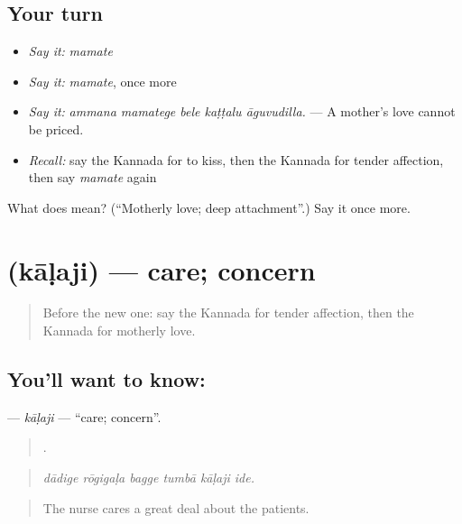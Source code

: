 \subsection*{Your turn}
\begin{itemize}
\raggedright
  \item \emph{Say it:} \emph{mamate}
  \item \emph{Say it:} \emph{mamate}, once more
  \item \emph{Say it:} \emph{ammana mamatege bele kaṭṭalu āguvudilla.} — A mother's love cannot be priced.
  \item \emph{Recall:} say the Kannada for to kiss, then the Kannada for tender affection, then say \emph{mamate} again
\end{itemize}

\begin{tcolorbox}[breakable,colback=teal!4,colframe=teal!35!black,title={Before you move on}]
What does  mean? (\textquotedblleft{}Motherly love; deep attachment\textquotedblright{}.) Say it once more.
\end{tcolorbox}
\section[\texorpdfstring{\kn{ಕಾಳಜಿ} (kāḷaji)}{ಕಾಳಜಿ (kāḷaji)}]{ (kāḷaji) — care; concern}

\label{lesson:KA-C495-kalaji}



\begin{quote}
Before the new one: say the Kannada for tender affection, then the Kannada for motherly love.
\end{quote}

\subsection*{You'll want to know: }
\textbf{} — \emph{kāḷaji} — \textquotedblleft{}care; concern\textquotedblright{}.

\begin{quote}
     .
\end{quote}

\begin{quote}
\emph{dādige rōgigaḷa bagge tumbā kāḷaji ide.}
\end{quote}

\begin{quote}
The nurse cares a great deal about the patients.
\end{quote}

